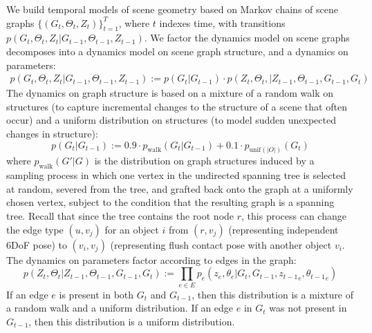 We build temporal models of scene geometry based on Markov chains of scene graphs $\{(G_t, \Theta_t, Z_t)\}_{t=1}^T$, where $t$ indexes time, with transitions $p(G_t, \Theta_t, Z_t | G_{t-1}, \Theta_{t-1}, Z_{t-1})$.
We factor the dynamics model on scene graphs decomposes into a dynamics model on scene graph structure, and a dynamics on parameters:
\begin{align}
    p(G_t, \Theta_t, Z_t | G_{t-1}, \Theta_{t-1}, Z_{t-1}) :=
        p(G_t | G_{t-1})
        \cdot p(Z_t, \Theta_t, | Z_{t-1}, \Theta_{t-1}, G_{t-1}, G_t)
\end{align}
The dynamics on graph structure is based on a mixture of a random walk on structures (to capture incremental changes to the structure of a scene that often occur) and a uniform distribution on structures (to model sudden unexpected changes in structure):
\begin{equation}
    p(G_t | G_{t-1}) :=  0.9 \cdot p_{\mathrm{walk}}(G_t | G_{t-1}) + 0.1 \cdot p_{\mathrm{unif}(|O|)}(G_t)
\end{equation}
where $p_{\mathrm{walk}}(G' | G)$ is the distribution on graph structures induced by a sampling process in which one vertex in the undirected spanning tree is selected at random, severed from the tree, and grafted back onto the graph at a uniformly chosen vertex, subject to the condition that the resulting graph is a spanning tree.
Recall that since the tree contains the root node $r$, this process can change the edge type $(u, v_j)$ for an object $i$ from $(r, v_j)$ (representing independent 6DoF pose) to $(v_i, v_j)$ (representing flush contact pose with another object $v_i$.
The dynamics on parameters factor according to edges in the graph:
\begin{equation}
    p(Z_t, \Theta_t | Z_{t-1}, \Theta_{t-1}, G_{t-1}, G_t) := \prod_{e \in E} p_e(z_e, \theta_e | G_t, G_{t-1}, {z_{t-1}}_e, {\theta_{t-1}}_e)
\end{equation}
If an edge $e$ is present in both $G_t$ and $G_{t-1}$, then this distribution is a mixture of a random walk and a uniform distribution.
If an edge $e$ in $G_t$ was not present in $G_{t-1}$, then this distribution is a uniform distribution.

\lstset{language=julia}
\lstset{style=Gen}

